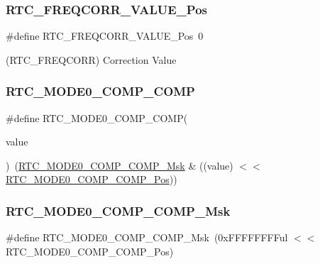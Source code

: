 \subsubsection{\texorpdfstring{RTC\_FREQCORR\_VALUE\_Pos}{RTC\_FREQCORR\_VALUE\_Pos}}
{\footnotesize\ttfamily \#define R\+T\+C\+\_\+\+F\+R\+E\+Q\+C\+O\+R\+R\+\_\+\+V\+A\+L\+U\+E\+\_\+\+Pos~0}



(R\+T\+C\+\_\+\+F\+R\+E\+Q\+C\+O\+RR) Correction Value 

\mbox{\label{group___s_a_m_d21___r_t_c_ga05fba8e35f463e7de4c802fcd80df02c}} 
\subsubsection{\texorpdfstring{RTC\_MODE0\_COMP\_COMP}{RTC\_MODE0\_COMP\_COMP}}
{\footnotesize\ttfamily \#define R\+T\+C\+\_\+\+M\+O\+D\+E0\+\_\+\+C\+O\+M\+P\+\_\+\+C\+O\+MP(\begin{DoxyParamCaption}\item[{}]{value }\end{DoxyParamCaption})~(\mbox{\hyperlink{group___s_a_m_d21___r_t_c_ga2818a3f8e81af4f5a8a5acc3732191b6}{R\+T\+C\+\_\+\+M\+O\+D\+E0\+\_\+\+C\+O\+M\+P\+\_\+\+C\+O\+M\+P\+\_\+\+Msk}} \& ((value) $<$$<$ \mbox{\hyperlink{group___s_a_m_d21___r_t_c_gad11fc5534c701be32db4687720ce549e}{R\+T\+C\+\_\+\+M\+O\+D\+E0\+\_\+\+C\+O\+M\+P\+\_\+\+C\+O\+M\+P\+\_\+\+Pos}}))}

\mbox{\label{group___s_a_m_d21___r_t_c_ga2818a3f8e81af4f5a8a5acc3732191b6}} 
\subsubsection{\texorpdfstring{RTC\_MODE0\_COMP\_COMP\_Msk}{RTC\_MODE0\_COMP\_COMP\_Msk}}
{\footnotesize\ttfamily \#define R\+T\+C\+\_\+\+M\+O\+D\+E0\+\_\+\+C\+O\+M\+P\+\_\+\+C\+O\+M\+P\+\_\+\+Msk~(0x\+F\+F\+F\+F\+F\+F\+F\+Ful $<$$<$ R\+T\+C\+\_\+\+M\+O\+D\+E0\+\_\+\+C\+O\+M\+P\+\_\+\+C\+O\+M\+P\+\_\+\+Pos)}


